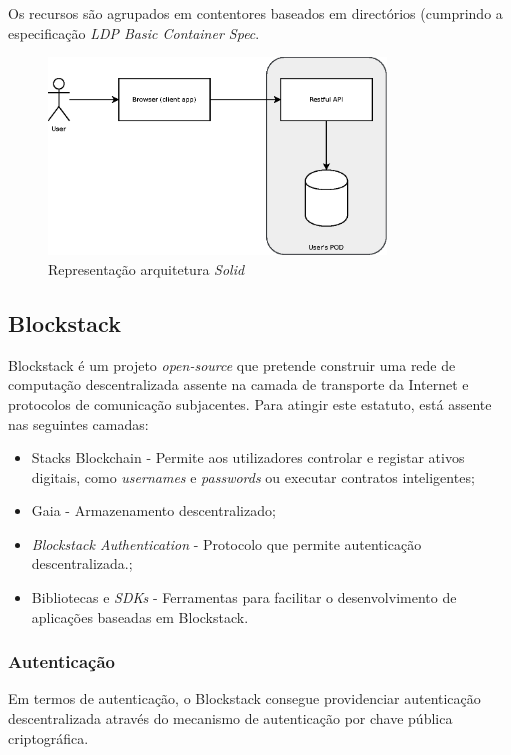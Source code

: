 Os recursos são agrupados em contentores baseados em directórios (cumprindo a especificação \emph{LDP Basic Container Spec}\cite{solid_spec}.

\begin{figure}[H]
    \begin{center}
    \includegraphics[width=0.8\textwidth]{figures/estado_arte-Solid.eps}
    \caption{Representação arquitetura \emph{Solid}}
    \label{estado_arte_representacao_solid}
    \end{center}
\end{figure}


\subsection{Blockstack}
Blockstack é um projeto \emph{open-source} que pretende construir uma rede de computação descentralizada assente na camada de transporte da Internet e protocolos de comunicação subjacentes. Para atingir este estatuto, está assente nas seguintes camadas:
\begin{itemize}
	\item Stacks Blockchain - Permite aos utilizadores controlar e registar ativos digitais, como \emph{usernames} e \emph{passwords} ou executar contratos inteligentes\cite{blockstack_white_paper};
	\item Gaia - Armazenamento descentralizado;
	\item \emph{Blockstack Authentication} - Protocolo que permite autenticação descentralizada.\cite{blockstack_white_paper};
	\item Bibliotecas e \emph{SDKs} - Ferramentas para facilitar o desenvolvimento de aplicações baseadas em Blockstack\cite{blockstack_white_paper}.
\end{itemize}

\subsubsection{Autenticação}
Em termos de autenticação, o Blockstack consegue providenciar autenticação descentralizada através do mecanismo de autenticação por chave pública criptográfica. 

